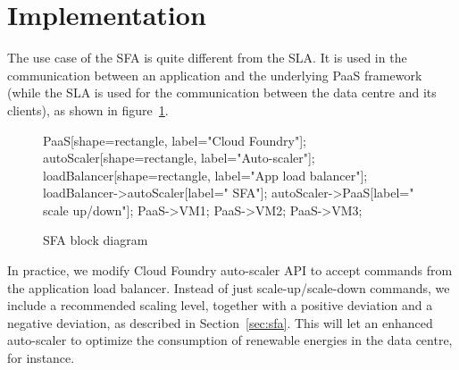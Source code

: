 \section{Implementation}
\label{sec:implem}

The use case of the SFA is quite different from the SLA. 
It is used in the communication between an application and the underlying PaaS framework (while the SLA is used for the communication between the data centre and its clients), as shown in figure~\ref{fig:SFABlock}.

\begin{figure}[h]
\label{fig:SFABlock}
\centering
\caption{SFA block diagram}
{
   PaaS[shape=rectangle, label="Cloud Foundry"];
   autoScaler[shape=rectangle, label="Auto-scaler"];
   loadBalancer[shape=rectangle, label="App load balancer"];
   loadBalancer->autoScaler[label=" SFA"];
   autoScaler->PaaS[label=" scale up/down"];
   PaaS->VM1;
   PaaS->VM2;
   PaaS->VM3;
}
\end{figure}

In practice, we modify Cloud Foundry auto-scaler API to accept commands from the application load balancer.
Instead of just scale-up/scale-down commands, we include a recommended scaling level, together with a positive deviation and a negative deviation, as described in Section~\ref{sec:sfa}.
This will let an enhanced auto-scaler to optimize the consumption of renewable energies in the data centre, for instance. 